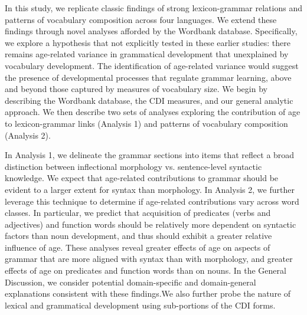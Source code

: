 \documentclass[10pt,letterpaper]{article}
\begin{document}
In this study, we replicate classic findings of strong lexicon-grammar relations and patterns of vocabulary composition across four languages. We extend these findings through novel analyses afforded by the Wordbank database. Specifically, we explore a hypothesis that not explicitly tested in these earlier studies: there remains age-related variance in grammatical development that unexplained by vocabulary development. The identification of age-related variance would suggest the presence of developmental processes that regulate grammar learning, above and beyond those captured by measures of vocabulary size.  We begin by describing the Wordbank database, the CDI measures, and our general analytic approach. We then describe two sets of analyses exploring the contribution of age to lexicon-grammar links (Analysis 1) and patterns of vocabulary composition (Analysis 2). 

In Analysis 1, we delineate the grammar sections into items that reflect a broad distinction between inflectional morphology vs. sentence-level syntactic knowledge. We expect that age-related contributions to grammar should be evident to a larger extent for syntax than morphology.  In Analysis 2, we further leverage this technique to determine if age-related contributions vary across word classes. In particular, we predict that acquisition of predicates (verbs and adjectives) and function words should be relatively more dependent on syntactic factors than noun development, and thus should exhibit a greater relative influence of age. These analyses reveal greater effects of age on aspects of grammar that are more aligned with syntax than with morphology, and greater effects of age on predicates and function words than on nouns. In the General Discussion, we consider potential domain-specific and domain-general explanations consistent with these findings.We also further probe the nature of lexical and grammatical development using sub-portions of the CDI forms. 
 

\end{document}

